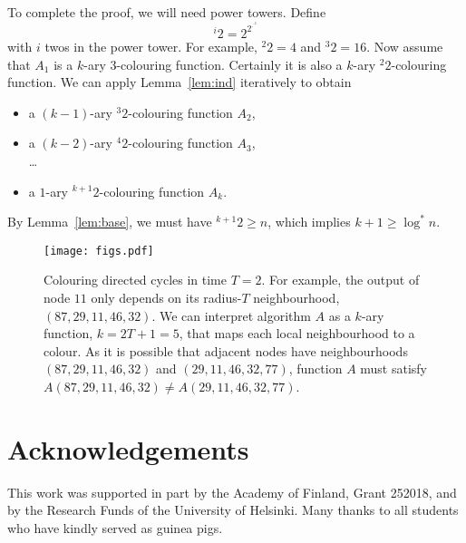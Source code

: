 \documentclass[11pt,a4paper]{article}
\begin{document}
To complete the proof, we will need power towers. Define
\[
    {}^i 2 = 2^{2^{\cdot^{\cdot^2}}}
\]
with $i$ twos in the power tower. For example, ${}^2 2 = 4$ and ${}^3 2 = 16$. Now assume that $A_1$ is a $k$-ary $3$-colouring function. Certainly it is also a $k$-ary ${}^2 2$-colouring function. We can apply Lemma~\ref{lem:ind} iteratively to obtain
\begin{itemize}[noitemsep]
    \item a $(k-1)$-ary ${}^3 2$-colouring function $A_2$,
    \item a $(k-2)$-ary ${}^4 2$-colouring function $A_3$, \\ \ldots
    \item a $1$-ary ${}^{k+1} 2$-colouring function $A_k$.
\end{itemize}
By Lemma~\ref{lem:base}, we must have ${}^{k+1} 2 \ge n$, which implies $k + 1 \ge \log^* n$.

\begin{figure}[b]
    \centering
    \texttt{[image: figs.pdf]}
    \caption{Colouring directed cycles in time $T = 2$. For example, the output of node $11$ only depends on its radius-$T$ neighbourhood, $(87,29,11,46,32)$. We can interpret algorithm $A$ as a $k$-ary function, $k = 2T+1 = 5$, that maps each local neighbourhood to a colour. As it is possible that adjacent nodes have neighbourhoods $(87,29,11,46,32)$ and $(29,11,46,32,77)$, function $A$ must satisfy $A(87,29,11,46,32) \ne A(29,11,46,32,77)$.}\label{fig:A}
\end{figure}

\section*{Acknowledgements}

This work was supported in part by the Academy of Finland, Grant 252018, and by the Research Funds of the University of Helsinki. Many thanks to all students who have kindly served as guinea pigs.


\def\UrlFont{\sf\footnotesize}
\setlength{\bibsep}{3pt}


\end{document}
